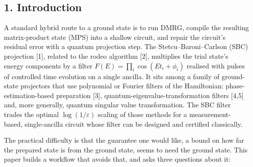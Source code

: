 \documentclass[
]{article}
\begin{document}
\hypertarget{introduction}{%
\subsection{1. Introduction}\label{introduction}}

A standard hybrid route to a ground state is to run DMRG, compile the
resulting matrix-product state (MPS) into a shallow circuit, and repair
the circuit's residual error with a quantum projection step. The
Stetcu--Baroni--Carlson (SBC) projection {[}1{]}, related to the rodeo
algorithm {[}2{]}, multiplies the trial state's energy components by a
filter \(F(E)=\prod_i\cos(Et_i+\phi_i)\) realised with pulses of
controlled time evolution on a single ancilla. It sits among a family of
ground-state projectors that use polynomial or Fourier filters of the
Hamiltonian: phase-estimation-based preparation {[}3{]},
quantum-eigenvalue-transformation filters {[}4,5{]} and, more generally,
quantum singular value transformation. The SBC filter trades the optimal
\(\log(1/\varepsilon)\) scaling of those methods for a
measurement-based, single-ancilla circuit whose filter can be designed
and certified classically.

The practical difficulty is that the guarantee one would like, a bound
on how far the prepared state is from the ground state, seems to need
the ground state. This paper builds a workflow that avoids that, and
asks three questions about it:
\end{document}
